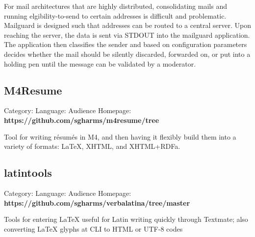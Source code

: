 \documentclass[]{article}
\begin{document}
For mail architectures that are highly distributed, consolidating mails and running elgibility-to-send to certain addresses is difficult and problematic.  Mailguard is designed such that addresses can be routed to a central server. Upon reaching the server, the data is sent via STDOUT into the mailguard application.  The application then classifies the sender and based on configuration parameters decides whether the mail should be silently discarded, forwarded on, or put into a holding pen until the message can be validated by a moderator.




\subsection*{M4Resume}
Category:  Language: Audience
Homepage: {\bf https://github.com/sgharms/m4resume/tree}

Tool for writing résumés in M4, and then having it flexibly build them into a variety of formats:  LaTeX, XHTML, and XHTML+RDFa.




\subsection*{latintools}
Category:  Language: Audience
Homepage: {\bf https://github.com/sgharms/verbalatina/tree/master}

Tools for entering LaTeX useful for Latin writing quickly through Textmate; also converting LaTeX glyphs at CLI to HTML or UTF-8 codes
\end{document}
